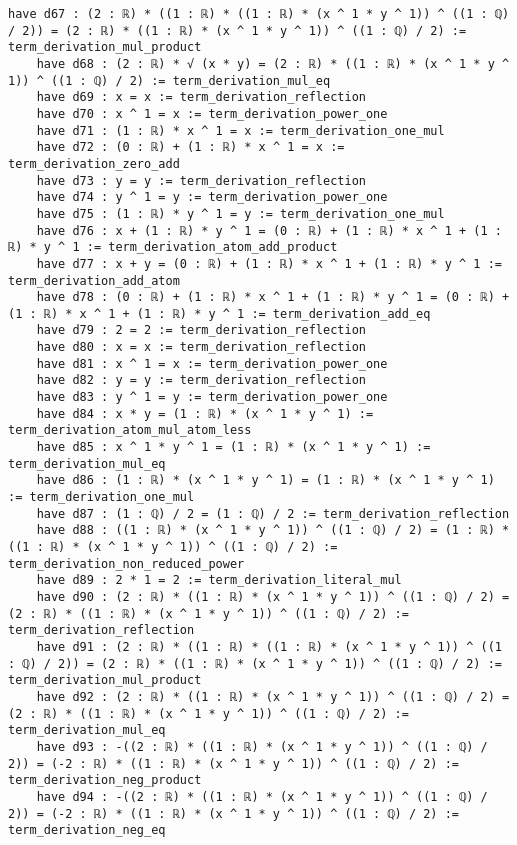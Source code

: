 \documentclass{article}
\begin{document}
\begin{tcolorbox}[colback=white!10, width=\linewidth]
\begin{lstlisting}[language=Lean4]
    have d67 : (2 : ℝ) * ((1 : ℝ) * ((1 : ℝ) * (x ^ 1 * y ^ 1)) ^ ((1 : ℚ) / 2)) = (2 : ℝ) * ((1 : ℝ) * (x ^ 1 * y ^ 1)) ^ ((1 : ℚ) / 2) := term_derivation_mul_product
    have d68 : (2 : ℝ) * √ (x * y) = (2 : ℝ) * ((1 : ℝ) * (x ^ 1 * y ^ 1)) ^ ((1 : ℚ) / 2) := term_derivation_mul_eq
    have d69 : x = x := term_derivation_reflection
    have d70 : x ^ 1 = x := term_derivation_power_one
    have d71 : (1 : ℝ) * x ^ 1 = x := term_derivation_one_mul
    have d72 : (0 : ℝ) + (1 : ℝ) * x ^ 1 = x := term_derivation_zero_add
    have d73 : y = y := term_derivation_reflection
    have d74 : y ^ 1 = y := term_derivation_power_one
    have d75 : (1 : ℝ) * y ^ 1 = y := term_derivation_one_mul
    have d76 : x + (1 : ℝ) * y ^ 1 = (0 : ℝ) + (1 : ℝ) * x ^ 1 + (1 : ℝ) * y ^ 1 := term_derivation_atom_add_product
    have d77 : x + y = (0 : ℝ) + (1 : ℝ) * x ^ 1 + (1 : ℝ) * y ^ 1 := term_derivation_add_atom
    have d78 : (0 : ℝ) + (1 : ℝ) * x ^ 1 + (1 : ℝ) * y ^ 1 = (0 : ℝ) + (1 : ℝ) * x ^ 1 + (1 : ℝ) * y ^ 1 := term_derivation_add_eq
    have d79 : 2 = 2 := term_derivation_reflection
    have d80 : x = x := term_derivation_reflection
    have d81 : x ^ 1 = x := term_derivation_power_one
    have d82 : y = y := term_derivation_reflection
    have d83 : y ^ 1 = y := term_derivation_power_one
    have d84 : x * y = (1 : ℝ) * (x ^ 1 * y ^ 1) := term_derivation_atom_mul_atom_less
    have d85 : x ^ 1 * y ^ 1 = (1 : ℝ) * (x ^ 1 * y ^ 1) := term_derivation_mul_eq
    have d86 : (1 : ℝ) * (x ^ 1 * y ^ 1) = (1 : ℝ) * (x ^ 1 * y ^ 1) := term_derivation_one_mul
    have d87 : (1 : ℚ) / 2 = (1 : ℚ) / 2 := term_derivation_reflection
    have d88 : ((1 : ℝ) * (x ^ 1 * y ^ 1)) ^ ((1 : ℚ) / 2) = (1 : ℝ) * ((1 : ℝ) * (x ^ 1 * y ^ 1)) ^ ((1 : ℚ) / 2) := term_derivation_non_reduced_power
    have d89 : 2 * 1 = 2 := term_derivation_literal_mul
    have d90 : (2 : ℝ) * ((1 : ℝ) * (x ^ 1 * y ^ 1)) ^ ((1 : ℚ) / 2) = (2 : ℝ) * ((1 : ℝ) * (x ^ 1 * y ^ 1)) ^ ((1 : ℚ) / 2) := term_derivation_reflection
    have d91 : (2 : ℝ) * ((1 : ℝ) * ((1 : ℝ) * (x ^ 1 * y ^ 1)) ^ ((1 : ℚ) / 2)) = (2 : ℝ) * ((1 : ℝ) * (x ^ 1 * y ^ 1)) ^ ((1 : ℚ) / 2) := term_derivation_mul_product
    have d92 : (2 : ℝ) * ((1 : ℝ) * (x ^ 1 * y ^ 1)) ^ ((1 : ℚ) / 2) = (2 : ℝ) * ((1 : ℝ) * (x ^ 1 * y ^ 1)) ^ ((1 : ℚ) / 2) := term_derivation_mul_eq
    have d93 : -((2 : ℝ) * ((1 : ℝ) * (x ^ 1 * y ^ 1)) ^ ((1 : ℚ) / 2)) = (-2 : ℝ) * ((1 : ℝ) * (x ^ 1 * y ^ 1)) ^ ((1 : ℚ) / 2) := term_derivation_neg_product
    have d94 : -((2 : ℝ) * ((1 : ℝ) * (x ^ 1 * y ^ 1)) ^ ((1 : ℚ) / 2)) = (-2 : ℝ) * ((1 : ℝ) * (x ^ 1 * y ^ 1)) ^ ((1 : ℚ) / 2) := term_derivation_neg_eq

\end{lstlisting}
\end{tcolorbox}
\end{document}
